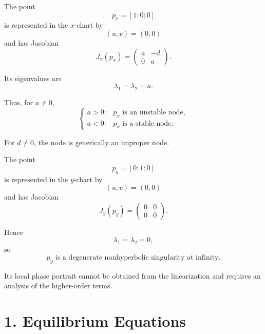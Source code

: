 \documentclass[11pt,a4paper]{article}
\begin{document}
The point
\begin{equation}
\boxed{
p_x=[1:0:0]
}
\end{equation}
is represented in the $x$-chart by
\begin{equation}
(u,v)=(0,0)
\end{equation}
and has Jacobian
\begin{equation}
\boxed{
J_x(p_x)
=
\begin{pmatrix}
a&-d\\
0&a
\end{pmatrix}.
}
\end{equation}

Its eigenvalues are
\begin{equation}
\boxed{
\lambda_1=\lambda_2=a.
}
\end{equation}

Thus, for $a\neq0$,
\begin{equation}
\boxed{
\begin{cases}
a>0:& p_x\text{ is an unstable node},\\[1mm]
a<0:& p_x\text{ is a stable node}.
\end{cases}
}
\end{equation}

For $d\neq0$, the node is generically an improper node.

The point
\begin{equation}
\boxed{
p_y=[0:1:0]
}
\end{equation}
is represented in the $y$-chart by
\begin{equation}
(u,v)=(0,0)
\end{equation}
and has Jacobian
\begin{equation}
\boxed{
J_y(p_y)
=
\begin{pmatrix}
0&0\\
0&0
\end{pmatrix}.
}
\end{equation}

Hence
\begin{equation}
\boxed{
\lambda_1=\lambda_2=0,
}
\end{equation}
so
\begin{equation}
\boxed{
p_y\text{ is a degenerate nonhyperbolic singularity at infinity}.
}
\end{equation}

Its local phase portrait cannot be obtained from the linearization and
requires an analysis of the higher-order terms.

\section{1. Equilibrium Equations}
\end{document}
